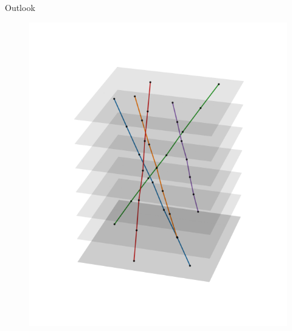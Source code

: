 \documentclass{beamer}
\begin{document}
\begin{frame}{Outlook}
\begin{minipage}{.44\textwidth}
\begin{itemize}
	\end{itemize}
    \end{minipage}
    \begin{minipage}{.55\textwidth}
	\begin{figure}[H]
	    \centering
	    \includegraphics[width=\textwidth]{outlook.png}
	\end{figure}
    \end{minipage}
\end{frame}
\end{document}
